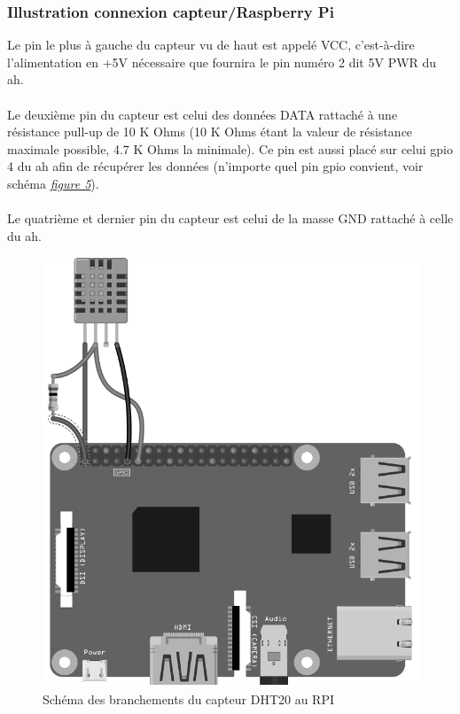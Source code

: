 \documentclass[a4paper]{article}
\begin{document}
\subsubsection{Illustration connexion capteur/Raspberry Pi}
\label{sec:branchementcapteur}
Le pin le plus à gauche du capteur vu de haut est appelé VCC, c'est-à-dire l'alimentation en +5V nécessaire que fournira le pin numéro 2 dit 5V PWR du \acrshort{ah}.\\\\Le deuxième pin du capteur est celui des données DATA rattaché à une résistance pull-up de 10 K Ohms (10 K Ohms étant la valeur de résistance maximale possible, 4.7 K Ohms la minimale). Ce pin est aussi placé sur celui \gls{gpio} 4 du \acrshort{ah} afin de récupérer les données (n'importe quel pin \gls{gpio} convient, voir schéma \hyperref[sec:fig5]{\textit{figure 5}}).\\\\Le quatrième et dernier pin du capteur est celui de la masse GND rattaché à celle du \acrshort{ah}.
\begin{figure}[!ht]
    \centering
    \includegraphics[scale=0.28]{grayscale_rpi1.png}
    \caption{Schéma des branchements du capteur DHT20 au RPI}
\end{figure}
\end{document}
